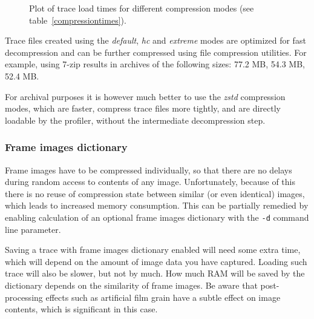 \documentclass[hidelinks,titlepage,a4paper]{article}
\begin{document}
\begin{figure}[H]
\centering{}
\caption{Plot of trace load times for different compression modes (see table~\ref{compressiontimes}).}
\label{loadtime}
\end{figure}

Trace files created using the \emph{default}, \emph{hc} and \emph{extreme} modes are optimized for fast decompression and can be further compressed using file compression utilities. For example, using 7-zip results in archives of the following sizes: 77.2 MB, 54.3 MB, 52.4 MB.

For archival purposes it is however much better to use the \emph{zstd} compression modes, which are faster, compress trace files more tightly, and are directly loadable by the profiler, without the intermediate decompression step.

\subsubsection{Frame images dictionary}
\label{fidict}

Frame images have to be compressed individually, so that there are no delays during random access to contents of any image. Unfortunately, because of this there is no reuse of compression state between similar (or even identical) images, which leads to increased memory consumption. This can be partially remedied by enabling calculation of an optional frame images dictionary with the \texttt{-d} command line parameter.

Saving a trace with frame images dictionary enabled will need some extra time, which will depend on the amount of image data you have captured. Loading such trace will also be slower, but not by much. How much RAM will be saved by the dictionary depends on the similarity of frame images. Be aware that post-processing effects such as artificial film grain have a subtle effect on image contents, which is significant in this case.
\end{document}

